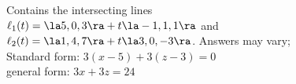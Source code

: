 {Contains the intersecting lines\\
$\ell_1(t) = \la 5,0,3\ra + t\la -1,1,1\ra$ and \\
$\ell_2(t) = \la 1,4,7\ra + t\la 3,0,-3\ra$.
}
{Answers may vary;\\
Standard form: $3(x-5)+3(z-3)=0$\\
general form: $3x+3z=24$
}

